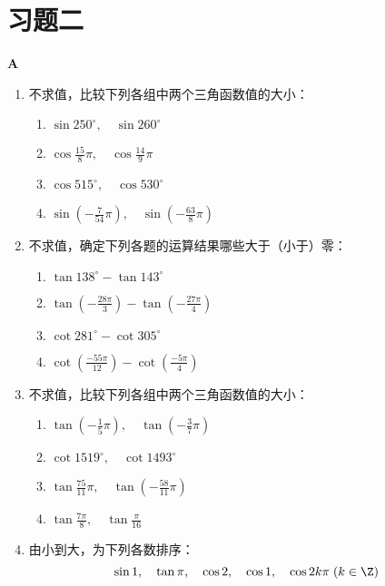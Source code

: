 \section*{习题二}
\begin{center}
    \bfseries A
\end{center}
\begin{enumerate}
\item 不求值，比较下列各组中两个三角函数值的大小：
\begin{multicols}{2}
\begin{enumerate}[(1)]
    \item $\sin250^{\circ},\quad \sin260^{\circ}$
    \item $\cos\frac{15}{8}\pi,\quad \cos\frac{14}{9}\pi$
    \item $\cos515^{\circ},\quad \cos530^{\circ}$
    \item $\sin\left(-\frac{7}{54}\pi\right),\quad \sin\left(-\frac{63}{8}\pi\right)$
\end{enumerate}
\end{multicols}
\item 不求值，确定下列各题的运算结果哪些大于（小于）零：
\begin{multicols}{2}
\begin{enumerate}[(1)]
    \item $\tan 138^{\circ}-\tan143^{\circ}$
    \item $\tan\left(-\frac{28\pi}{3}\right)-\tan\left(-\frac{27\pi}{4}\right)$
    \item $\cot281^{\circ}-\cot305^{\circ}$
    \item $\cot\left(\frac{-55\pi}{12}\right)-\cot\left(\frac{-5\pi}{4}\right)$
\end{enumerate}
\end{multicols}
\item 不求值，比较下列各组中两个三角函数值的大小：
\begin{multicols}{2}
\begin{enumerate}[(1)]
    \item $\tan\left(-\frac{1}{5}\pi\right),\quad \tan\left(-\frac{3}{7}\pi\right)$
    \item $\cot1519^{\circ},\quad \cot1493^{\circ}$
    \item $\tan\frac{75}{11}\pi,\quad \tan\left(-\frac{58}{11}\pi\right)$
    \item $\tan\frac{7\pi}{8},\quad \tan\frac{\pi}{16}$
\end{enumerate}
\end{multicols}
\item 由小到大，为下列各数排序：
\[\sin 1,\quad \tan\pi,\quad \cos 2,\quad \cos 1,\quad \cos2k\pi\; (k\in\Z)\]


\end{enumerate}
